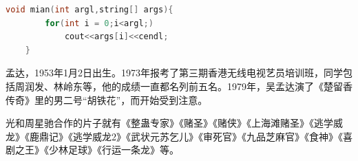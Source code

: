 \documentclass[UTF8]{ctexart}
\begin{document}
\begin{lstlisting}[language=c]
    void mian(int argl,string[] args){
        for(int i = 0;i<argl;)
            cout<<args[i]<<cendl;
    }
\end{lstlisting}



\begin{multicols}{2}  %
    孟达，1953年1月2日出生。1973年报考了第三期香港无线电视艺员培训班，同学包括周润发、林岭东等，他的成绩一直都名列前五名。1979年，吴孟达演了《楚留香传奇》里的男二号“胡铁花”，而开始受到注意。
\end{multicols}
\begin{multicols}{2}

    光和周星驰合作的片子就有《整蛊专家》《赌圣》《赌侠》《上海滩赌圣》《逃学威龙》《鹿鼎记》《逃学威龙2》《武状元苏乞儿》《审死官》《九品芝麻官》《食神》《喜剧之王》《少林足球》《行运一条龙》等。
\end{multicols}
\end{document}
